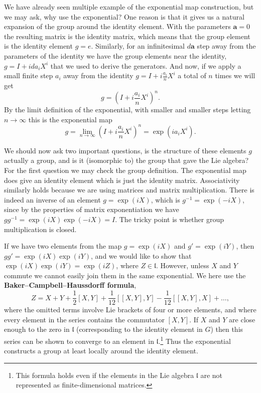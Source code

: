 \documentclass[notes.tex]{subfiles}
\begin{document}
We have already seen multiple example of the exponential map construction, but we may ask, why use the exponential? One reason is that it gives us a natural expansion of the group around the identity element. With the parameters $\mathbf a=0$ the resulting matrix is the identity matrix, which means that the group element is the identity element $g=e$. Similarly, for an infinitesimal $d\mathbf a$ step away from the parameters of the identity we have the group elements near the identity, $g=I+ida_iX^i$ that we used to derive the generators. And now, if we apply a small finite step  $a_i$ away from the identity $g=I+i\frac{a_i}{n}X^i$ a total of $n$ times we will get
\[g=\left(I+i\frac{a_i}{n}X^i\right)^n. \]
By the limit definition of the exponential, with smaller and smaller steps letting $n\to\infty$ this is the exponential map
\[g=\lim_{n\to\infty}\left(I+i\frac{a_i}{n}X^i\right)^n=\exp( ia_iX^i). \]

We should now ask two important questions, is the structure of these elements $g$ actually a group, and is it (isomorphic to) the group that gave the Lie algebra? For the first question we may check the group definition. The exponential map does give an identity element which is just the identity matrix. Associativity similarly holds because we are using matrices and matrix multiplication. There is indeed an inverse of an element $g=\exp{(iX)}$, which is $g^{-1}=\exp{(-iX)}$, since by the properties of matrix exponentiation we have $gg^{-1}=\exp{(iX)}\exp{(-iX)}=I$. The tricky point is whether group multiplication is closed.

If we have two elements from the map $g=\exp{(iX)}$ and $g'=\exp{(iY)}$, then $gg'=\exp{(iX)}\exp{(iY)}$, and we would like to show that  $\exp{(iX)}\exp{(iY)}=\exp{(iZ)}$, where $Z\in\mathfrak l$. However, unless $X$ and $Y$ commute we cannot  easily join them in the same exponential. We here use the {\bf Baker--Campbell--Haussdorff  formula},
\begin{equation}
Z=X+Y+\frac{1}{2}[X,Y]+\frac{1}{12}[[X,Y],Y]-\frac{1}{12}[[X,Y],X]+\ldots,
\label{eq:BKH_matrices}
\end{equation}
where the omitted terms involve Lie brackets of four or more elements, and where every element in the series contains the commutator $[X,Y]$. If $X$ and $Y$ are close enough to the zero in $\mathfrak l$ (corresponding to the identity element in $G$) then this series can be shown to converge to an element in $\mathfrak l$.\footnote{This formula holds even if the elements in the Lie algebra ${\mathfrak l}$ are not represented as finite-dimensional matrices.} Thus the exponential constructs a group at least locally around the identity element.
\end{document}
